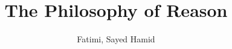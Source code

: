 \documentclass[oneside]{book}
\title{The Philosophy of Reason}
\author{Fatimi, Sayed Hamid}
\date{}
\begin{document}
    \maketitle{}

    \frontmatter{}
    \tableofcontents{}

    \mainmatter{}

    


    


    


    


    


    


    


    


    \backmatter{}
    \printbibliography{}
\end{document}
